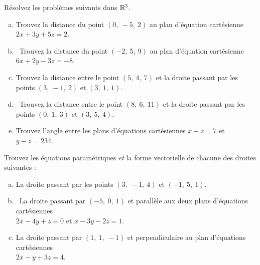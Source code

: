 \begin{prob}
\begin{enumerate}[a)]
\end{enumerate}



\end{prob} \begin{prob} \label{prob03.4}  Résolvez les problèmes suivants dans $\mathbb{R}^3$. \medskip
\begin{enumerate}[a)]

\item Trouvez la distance du point $(0,\ -5,\ 2)$ au plan d'équation cartésienne
$2x+3y+5z=2$. \medskip

\item\sov~Trouvez la distance du point $(-2,\ 5,\ 9)$ au plan d'équation cartésienne
$6x+2y-3z=-8$. \medskip
\item Trouvez la distance entre le point $(5,\ 4,\ 7)$ et la droite passant par les points  $(3,\ -1,\ 2)$ et $(3,\ 1,\ 1)$.
\medskip



\item\sov~Trouvez la distance entre le point $(8,\ 6,\ 11)$ et la droite passant par les points $(0,\ 1,\ 3)$ et $(3,\ 5,\ 4)$.  \medskip
 
\item Trouvez l'angle entre les plans d'équations cartésiennes $x-z=7$ et $y-z=234$.
\medskip




\end{enumerate}

\end{prob} \begin{prob} \label{prob03.5}  Trouvez les équations paramétriques {\it et} la forme vectorielle de chacune des droites suivantes :
\medskip
\begin{enumerate}[a)]

\item La droite passant par les points $(3,\ -1,\ 4)$ et $(-1,\ 5,\ 1)$. \medskip
\item\sov~La droite passant par $(-5,\ 0,\ 1)$ et parallèle aux deux plans d'équations cartésiennes\\ $2x-4y+z=0$ et $x-3y-2z=1$. 
\medskip
\item La droite passant par $(1,\ 1,\ -1)$ et perpendiculaire au plan d'équations cartésiennes\\ $2x-y+3z=4$. \medskip
\end{enumerate}


\end{prob}
